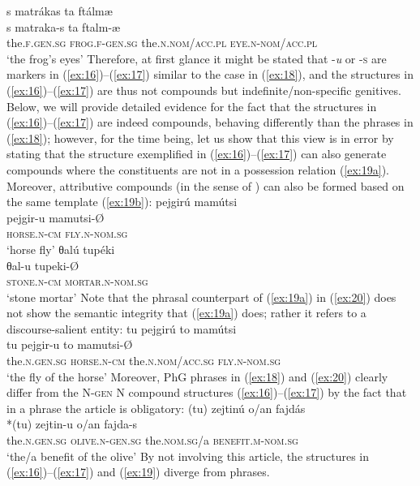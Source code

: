 \documentclass[output=paper]{LSP/langsci}
\begin{document}
	\ex\label{ex:18b}
		\glll s matrákas ta ftálm{\ae}\\
				s matraka-s ta ftalm-{\ae}\\
				the.\textsc{f.gen.sg} \textsc{frog.f-gen.sg} the.\textsc{n.nom/acc.pl} \textsc{eye}.\textsc{n-nom/acc.pl}\\
		\glt `the frog's eyes'
	\z
\z
Therefore, at first glance it might be stated that -\textit{u} or -\textsc{s} are  markers in (\ref{ex:16})--(\ref{ex:17}) similar to the case in (\ref{ex:18}), and the structures in  (\ref{ex:16})--(\ref{ex:17}) are thus not compounds but indefinite/non-specific genitives. Below, we will provide detailed evidence for the fact that the structures in  (\ref{ex:16})--(\ref{ex:17}) are indeed compounds, behaving differently than the phrases in (\ref{ex:18}); however, for the time being, let us show that this view is in error by stating that the structure exemplified in  (\ref{ex:16})--(\ref{ex:17}) can also generate compounds where the constituents are not in a possession relation (\ref{ex:19a}).  	Moreover, attributive compounds (in the sense of \citealt{ScaliseBisetto2009}) can also be formed based on the same template (\ref{ex:19b}):
\ea\label{ex:19}
	\ea\label{ex:19a}
		\glll pejgirú mamútsi\\
				pejgir-u mamutsi-\O \\
				\textsc{horse.n-cm} \textsc{fly.n-nom.sg}\\
		\glt `horse fly'
	\ex\label{ex:19b}
		\glll θalú tupéki\\
				θal-u tupeki-\O \\
				\textsc{stone.n-cm} \textsc{mortar.n-nom.sg}\\
		\glt `stone mortar'
	\z
\z
Note that the  phrasal counterpart of (\ref{ex:19a}) in (\ref{ex:20}) does not show the semantic integrity that (\ref{ex:19a}) does; rather it refers to a discourse-salient entity:
\ea\label{ex:20}
	\glll tu pejgirú to mamútsi\\
			tu	pejgir-u to mamutsi-\O \\
			the.\textsc{n.gen.sg}	\textsc{horse.n-cm} the.\textsc{n.nom/acc.sg} \textsc{fly.n-nom.sg}\\
		\glt `the fly of the horse'
\z
Moreover, PhG  phrases in (\ref{ex:18}) and (\ref{ex:20}) clearly differ from the N-\textsc{gen} N compound structures (\ref{ex:16})--(\ref{ex:17}) by the fact that in a  phrase the  article is obligatory: 
\ea\label{ex:21}
	\glll *(tu) zejtinú  o/an fajdás\\
			*(tu) zejtin-u o/an fajda-s\\
				the.\textsc{n.gen.sg} \textsc{olive.n-gen.sg} the\textsc{.nom.sg}/a \textsc{benefit.m-nom.sg}\\
		\glt `the/a benefit of the olive'
\z
By not involving this  article, the structures in (\ref{ex:16})–(\ref{ex:17}) and (\ref{ex:19}) diverge from  phrases.
\end{document}

